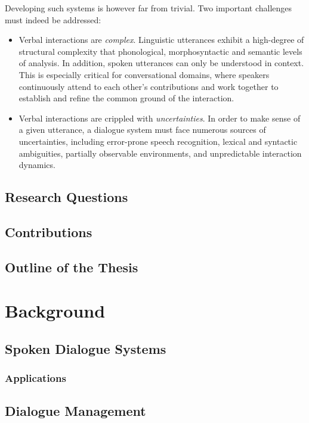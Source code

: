 \documentclass[english,12pt]{uiophd}
\begin{document}
Developing such systems is however far from trivial.  Two important challenges must indeed be addressed:
\begin{itemize}
\item Verbal interactions are \textit{complex}.  Linguistic utterances exhibit a high-degree of structural complexity that phonological, morphosyntactic and semantic levels of analysis.  In addition, spoken utterances can only be understood in context. This is especially critical for conversational domains, where speakers continuously attend to each other's contributions and work together to establish and refine the common ground of the interaction. 
\item Verbal interactions are crippled with \textit{uncertainties}.  In order to make sense of a given utterance, a dialogue system must face numerous sources of uncertainties, including error-prone speech recognition, lexical and syntactic ambiguities, partially observable environments, and unpredictable interaction dynamics. 
\end{itemize} 

\section{Research Questions}

\section{Contributions}

\section{Outline of the Thesis}


\chapter{Background}

\section{Spoken Dialogue Systems}

\subsection{Applications}

\section{Dialogue Management}
\end{document}
